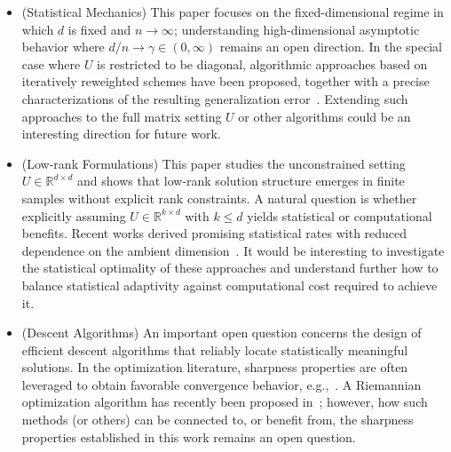 \documentclass[sn-mathphys-num]{sn-jnl}%
\numberwithin{equation}{section}
\theoremstyle{thmstyleone}%
\theoremstyle{thmstyletwo}%
\theoremstyle{thmstylethree}%
\begin{document}
\begin{itemize}
\vspace{.5em} 
\item (Statistical Mechanics) 
This paper focuses on the fixed-dimensional regime in which $d$ is fixed and $n \to \infty$; understanding high-dimensional asymptotic behavior where $d/n \to \gamma \in (0, \infty)$ remains an open direction. In the special case where $U$ is restricted to be diagonal,  algorithmic approaches based on iteratively reweighted schemes have been proposed, together with a precise characterizations of the resulting generalization error~\cite{ZhuDaDrFa25}. Extending such approaches to the full matrix setting $U$ or other algorithms could be an interesting direction for future work.






\vspace{.5em}
\item (Low-rank Formulations) 
This paper studies the unconstrained setting $U \in \mathbb{R}^{d \times d}$ and shows that low-rank solution structure emerges in finite samples without explicit rank constraints. A natural question is whether explicitly assuming $U \in \mathbb{R}^{k \times d}$ with $k \le d$ yields statistical or computational benefits. Recent works derived promising statistical rates with reduced dependence on the ambient dimension~\cite{FollainBa24,HuangLaDePoRo25}. It would be interesting to investigate the statistical optimality of these approaches and understand further how to balance statistical adaptivity against computational cost required to achieve it.







\vspace{.5em} 
\item (Descent Algorithms)
An important open question concerns the design of efficient descent algorithms that reliably locate statistically meaningful solutions. %
In the optimization literature, sharpness properties are often leveraged to obtain favorable convergence behavior, e.g.,~\cite{BurkeDe02, BurkeDe05}. A Riemannian optimization algorithm has recently been proposed in~\cite{LiRub25}; however, how such methods (or others) can be connected to, or benefit from, the sharpness properties established in this work remains an open question.




\end{itemize}
\end{document}
